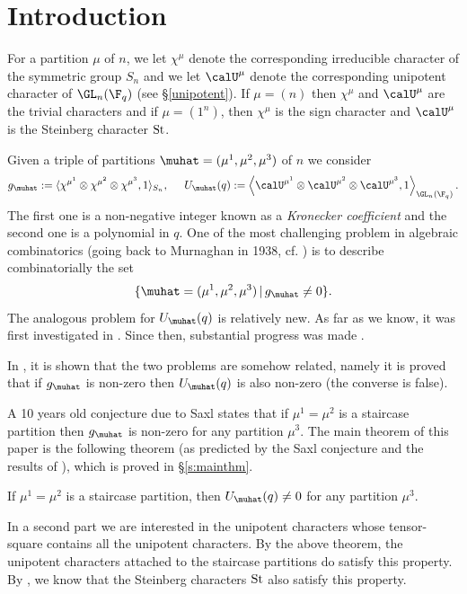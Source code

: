 \section{Introduction}\label{intro}

For a partition $\mu$ of $n$, we let $\chi^\mu$ denote the corresponding irreducible character of the symmetric group $S_n$ and we let $\calU^\mu$ denote the corresponding unipotent character of $\GL_n(\F_q)$ (see \S \ref{unipotent}). If $\mu=(n)$ then $\chi^\mu$ and $\calU^\mu$ are the trivial characters and if $\mu=(1^n)$, then $\chi^\mu$ is the sign character and $\calU^\mu$ is the Steinberg character ${\rm St}$. 


Given a triple of partitions $\muhat=(\mu^1,\mu^2,\mu^3)$ of $n$ we consider
$$
g_\muhat:=\langle\chi^{\mu^1}\otimes\chi^{\mu^2}\otimes\chi^{\mu^3},1\rangle_{S_n},\hspace{.5cm}U_\muhat(q):=\left\langle\calU^{\mu^1}\otimes\calU^{\mu^2}\otimes\calU^{\mu^3},1\right\rangle_{\GL_n(\F_q)}.$$
The first one is a non-negative integer known as a \emph{Kronecker coefficient} and the second one is a polynomial in $q$. One of the most challenging problem in algebraic combinatorics (going back to Murnaghan in 1938, cf. \cite{Mu})  is to describe combinatorially the set 
$$
\{\muhat=(\mu^1,\mu^2,\mu^3)\,|\, g_\muhat\neq 0\}.$$
The  analogous problem for $U_\muhat(q)$ is relatively new. As far as we know, it was first investigated in \cite{HLM}. Since then, substantial progress was made \cite{Lu1}\cite{L1}\cite{L2}\cite{HSTZ}\cite{S}.


In \cite{L1}, it is shown that the two problems are somehow related, namely it is proved that if $g_\muhat$ is non-zero  then $U_\muhat(q)$ is also non-zero (the converse is false).


A 10 years old conjecture due to Saxl states that if $\mu^1=\mu^2$ is a staircase partition then $g_\muhat$ is non-zero for any partition $\mu^3$. The main theorem of this paper is the following theorem (as predicted by the Saxl conjecture and the results of \cite{L1}), which is proved in \S\ref{s:mainthm}.


\begin{theo} If $\mu^1=\mu^2$ is a staircase partition, then $U_\muhat(q)\neq 0$ for any partition $\mu^3$.
	\label{theointro}\end{theo}


In a second part we are interested in the unipotent characters whose tensor-square contains all the unipotent characters. By the above theorem, the unipotent characters  attached to the staircase partitions do satisfy this property.  By \cite{HSTZ}\cite{L1}, we know that the Steinberg characters ${\rm St}$ also satisfy this property. 


